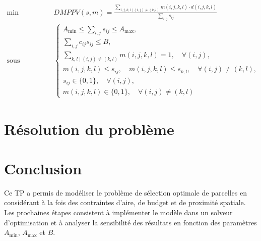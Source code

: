 \documentclass[a4paper,11pt]{article}
\begin{document}
\[
\begin{aligned}
\min \quad & DMPPV(s,m) =
\frac{
\displaystyle\sum_{i,j,k,l \;\big|\; (i,j) \neq (k,l)} m(i,j,k,l) \cdot d(i,j,k,l)
}{
\displaystyle\sum_{i,j} s_{ij}
} \\[4pt]
\text{sous contraintes} \quad &
\begin{cases}
A_{\min} \leq \displaystyle\sum_{i,j}  s_{ij} \leq A_{\max},\\[4pt]
\displaystyle\sum_{i,j} c_{ij} s_{ij} \leq B,\\[4pt]
\sum_{k,l \;\big|\; (i,j) \neq (k,l)} m(i,j,k,l) = 1, \quad \forall (i,j),\\[2pt]
m(i,j,k,l) \leq s_{ij}, \quad m(i,j,k,l) \leq s_{k,l}, \quad \forall (i,j) \neq (k,l),\\[2pt]
s_{ij} \in \{0,1\}, \quad \forall (i,j),\\
m(i,j,k,l) \in \{0,1\}, \quad \forall (i,j) \neq (k,l)
\end{cases}
\end{aligned}
\]
\section{Résolution du problème}


\section{Conclusion}

Ce TP a permis de modéliser le problème de sélection optimale de parcelles
en considérant à la fois des contraintes d’aire, de budget et de proximité spatiale.
Les prochaines étapes consistent à implémenter le modèle dans un solveur d’optimisation
et à analyser la sensibilité des résultats en fonction des paramètres $A_{\min}$, $A_{\max}$ et $B$.
\end{document}
